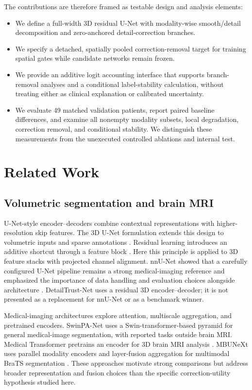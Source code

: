 \documentclass[conference]{IEEEtran}
\begin{document}
The contributions are therefore framed as testable design and analysis elements:
\begin{itemize}
\item We define a full-width 3D residual U-Net with modality-wise smooth/detail decomposition and zero-anchored detail-correction branches.
\item We specify a detached, spatially pooled correction-removal target for training spatial gates while candidate networks remain frozen.
\item We provide an additive logit accounting interface that supports branch-removal analyses and a conditional label-stability calculation, without treating either as clinical explanation or calibrated uncertainty.
\item We evaluate 49 matched validation patients, report paired baseline differences, and examine all nonempty modality subsets, local degradation, correction removal, and conditional stability. We distinguish these measurements from the unexecuted controlled ablations and internal test.
\end{itemize}

\section{Related Work}
\subsection{Volumetric segmentation and brain MRI}
U-Net-style encoder--decoders combine contextual representations with higher-resolution skip features. The 3D U-Net formulation extends this design to volumetric inputs and sparse annotations \cite{cicek2016}. Residual learning introduces an additive shortcut through a feature block \cite{he2016resnet}. Here this principle is applied to 3D feature stacks with projected channel alignment. nnU-Net showed that a carefully configured U-Net pipeline remains a strong medical-imaging reference and emphasized the importance of data handling and evaluation choices alongside architecture \cite{isensee2021}. DetailTrust-Net uses a residual 3D encoder--decoder; it is not presented as a replacement for nnU-Net or as a benchmark winner.

Medical-imaging architectures explore attention, multiscale aggregation, and pretrained encoders. SwinPA-Net uses a Swin-transformer-based pyramid for general medical-image segmentation, with reported tasks outside brain MRI. Medical Transformer pretrains an encoder for 3D brain MRI analysis \cite{du2024swinpa,jun2024medtrans}. MBUNeXt uses parallel modality encoders and layer-fusion aggregation for multimodal BraTS segmentation \cite{liu2025mbunext}. These approaches motivate strong comparisons but address broader representation and fusion choices than the specific correction-utility hypothesis studied here.
\end{document}
